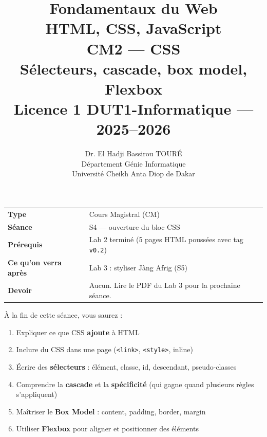 \documentclass[11pt,a4paper]{article}
\title{%
\vspace{-1cm}
\textbf{\LARGE Fondamentaux du Web}\\
\textbf{\LARGE HTML, CSS, JavaScript}\\[0.8cm]
\textbf{\huge CM2 --- CSS}\\[0.3cm]
\textbf{\Large Sélecteurs, cascade, box model, Flexbox}\\[0.5cm]
\large Licence 1 DUT1-Informatique --- 2025--2026}
\author{Dr. El Hadji Bassirou TOURÉ\\
Département Génie Informatique\\
Université Cheikh Anta Diop de Dakar}
\date{}
\begin{document}
\maketitle
\thispagestyle{empty}

\vspace{0.5cm}

\begin{prereqbox}
\begin{center}
\begin{tabular}{ll}
\toprule
\textbf{Type} & Cours Magistral (CM) \\
\textbf{Séance} & S4 --- ouverture du bloc CSS \\
\textbf{Prérequis} & Lab 2 terminé (5 pages HTML poussées avec tag \texttt{v0.2}) \\
\textbf{Ce qu'on verra après} & Lab 3 : styliser Jàng Afrig (S5) \\
\textbf{Devoir} & Aucun. Lire le PDF du Lab 3 pour la prochaine séance. \\
\bottomrule
\end{tabular}
\end{center}
\end{prereqbox}

\begin{objectifbox}[Objectifs du CM]
À la fin de cette séance, vous saurez :
\begin{enumerate}[nosep]
    \item Expliquer ce que CSS \textbf{ajoute} à HTML
    \item Inclure du CSS dans une page (\texttt{<link>}, \texttt{<style>}, inline)
    \item Écrire des \textbf{sélecteurs} : élément, classe, id, descendant, pseudo-classes
    \item Comprendre la \textbf{cascade} et la \textbf{spécificité} (qui gagne quand plusieurs règles s'appliquent)
    \item Maîtriser le \textbf{Box Model} : content, padding, border, margin
    \item Utiliser \textbf{Flexbox} pour aligner et positionner des éléments
\end{enumerate}
\end{objectifbox}

\tableofcontents

\newpage
\end{document}
